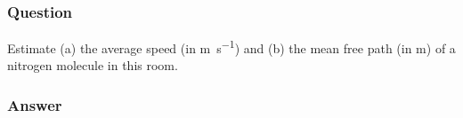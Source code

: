 \subsubsection{Question}

Estimate (a) the average speed (in \si{\m\per\s}) and (b) the mean free path
(in \si{\m}) of a nitrogen molecule in this room.

\subsubsection{Answer}

